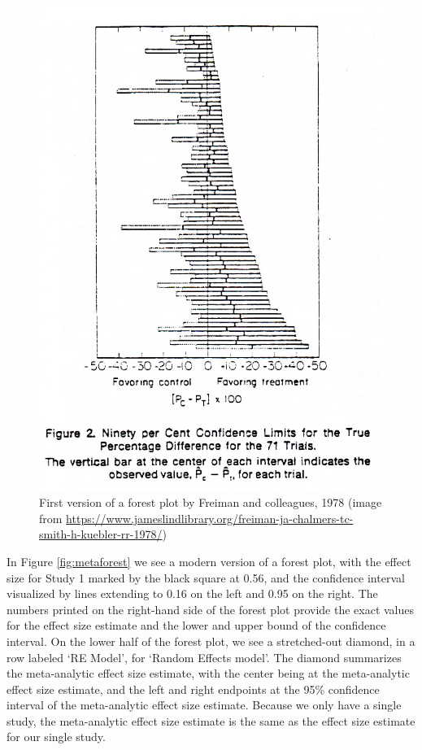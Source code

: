 \documentclass[
  oneside]{book}
\begin{document}
\begin{figure}

{\centering \includegraphics[width=1\linewidth]{images/freiman1978} 

}

\caption{First version of a forest plot by Freiman and colleagues, 1978 (image from \url{https://www.jameslindlibrary.org/freiman-ja-chalmers-tc-smith-h-kuebler-rr-1978/})}\label{fig:freiman1978}
\end{figure}

In Figure \ref{fig:metaforest} we see a modern version of a forest plot, with the effect size for Study 1 marked by the black square at 0.56, and the confidence interval visualized by lines extending to 0.16 on the left and 0.95 on the right. The numbers printed on the right-hand side of the forest plot provide the exact values for the effect size estimate and the lower and upper bound of the confidence interval. On the lower half of the forest plot, we see a stretched-out diamond, in a row labeled `RE Model', for `Random Effects model'. The diamond summarizes the meta-analytic effect size estimate, with the center being at the meta-analytic effect size estimate, and the left and right endpoints at the 95\% confidence interval of the meta-analytic effect size estimate. Because we only have a single study, the meta-analytic effect size estimate is the same as the effect size estimate for our single study.
\end{document}
